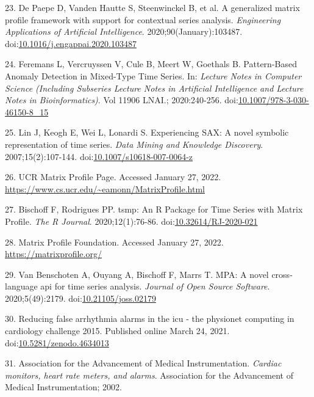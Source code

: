 \documentclass[12pt,twoside]{fmupthesis}
\begin{document}
\leavevmode\hypertarget{ref-DePaepe2020}{}%
23. De Paepe D, Vanden Hautte S, Steenwinckel B, et al. A generalized matrix profile framework with support for contextual series analysis. \emph{Engineering Applications of Artificial Intelligence}. 2020;90(January):103487. doi:\href{https://doi.org/10.1016/j.engappai.2020.103487}{10.1016/j.engappai.2020.103487}

\leavevmode\hypertarget{ref-Feremans2020}{}%
24. Feremans L, Vercruyssen V, Cule B, Meert W, Goethals B. Pattern-Based Anomaly Detection in Mixed-Type Time Series. In: \emph{Lecture Notes in Computer Science (Including Subseries Lecture Notes in Artificial Intelligence and Lecture Notes in Bioinformatics)}. Vol 11906 LNAI.; 2020:240-256. doi:\href{https://doi.org/10.1007/978-3-030-46150-8_15}{10.1007/978-3-030-46150-8\_15}

\leavevmode\hypertarget{ref-Lin2007}{}%
25. Lin J, Keogh E, Wei L, Lonardi S. Experiencing SAX: A novel symbolic representation of time series. \emph{Data Mining and Knowledge Discovery}. 2007;15(2):107-144. doi:\href{https://doi.org/10.1007/s10618-007-0064-z}{10.1007/s10618-007-0064-z}

\leavevmode\hypertarget{ref-mpucr}{}%
26. UCR Matrix Profile Page. Accessed January 27, 2022. \url{https://www.cs.ucr.edu/~eamonn/MatrixProfile.html}

\leavevmode\hypertarget{ref-RJ-2020-021}{}%
27. Bischoff F, Rodrigues PP. tsmp: An R Package for Time Series with Matrix Profile. \emph{The R Journal}. 2020;12(1):76-86. doi:\href{https://doi.org/10.32614/RJ-2020-021}{10.32614/RJ-2020-021}

\leavevmode\hypertarget{ref-mpf2020}{}%
28. Matrix Profile Foundation. Accessed January 27, 2022. \url{https://matrixprofile.org/}

\leavevmode\hypertarget{ref-VanBenschoten2020}{}%
29. Van Benschoten A, Ouyang A, Bischoff F, Marrs T. MPA: A novel cross-language api for time series analysis. \emph{Journal of Open Source Software}. 2020;5(49):2179. doi:\href{https://doi.org/10.21105/joss.02179}{10.21105/joss.02179}

\leavevmode\hypertarget{ref-bischoff2021}{}%
30. Reducing false arrhythmia alarms in the icu - the physionet computing in cardiology challenge 2015. Published online March 24, 2021. doi:\href{https://doi.org/10.5281/zenodo.4634013}{10.5281/zenodo.4634013}

\leavevmode\hypertarget{ref-AAMI2002}{}%
31. Association for the Advancement of Medical Instrumentation. \emph{Cardiac monitors, heart rate meters, and alarms}. Association for the Advancement of Medical Instrumentation; 2002.
\end{document}
